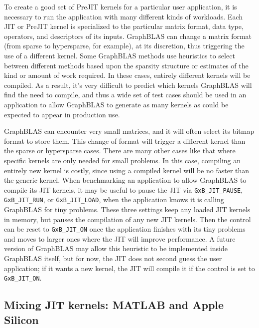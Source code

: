 \documentclass[12pt]{article}
\begin{document}
To create a good set of PreJIT kernels for a particular user application, it is
necessary to run the application with many different kinds of workloads.  Each
JIT or PreJIT kernel is specialized to the particular matrix format, data type,
operators, and descriptors of its inputs.  GraphBLAS can change a matrix format
(from sparse to hypersparse, for example), at its discretion, thus triggering
the use of a different kernel.  Some GraphBLAS methods use heuristics to select
between different methods based upon the sparsity structure or estimates of the
kind or amount of work required.  In these cases, entirely different kernels
will be compiled.  As a result, it's very difficult to predict which kernels
GraphBLAS will find the need to compile, and thus a wide set of test cases
should be used in an application to allow GraphBLAS to generate as many kernels
as could be expected to appear in production use.

GraphBLAS can encounter very small matrices, and it will often select its
bitmap format to store them.  This change of format will trigger a different
kernel than the sparse or hypersparse cases.  There are many other cases like
that where specific kernels are only needed for small problems.  In this case,
compiling an entirely new kernel is costly, since using a compiled kernel will
be no faster than the generic kernel.  When benchmarking an application to
allow GraphBLAS to compile its JIT kernels, it may be useful to pause the JIT
via \verb'GxB_JIT_PAUSE', \verb'GxB_JIT_RUN', or \verb'GxB_JIT_LOAD', when the
application knows it is calling GraphBLAS for tiny problems.  These three
settings keep any loaded JIT kernels in memory, but pauses the compilation of
any new JIT kernels.  Then the control can be reset to \verb'GxB_JIT_ON' once
the application finishes with its tiny problems and moves to larger ones where
the JIT will improve performance.  A future version of GraphBLAS may allow
this heuristic to be implemented inside GraphBLAS itself, but for now, the
JIT does not second guess the user application; if it wants a new kernel,
the JIT will compile it if the control is set to \verb'GxB_JIT_ON'.

\subsection{Mixing JIT kernels: MATLAB and Apple Silicon}
\end{document}
